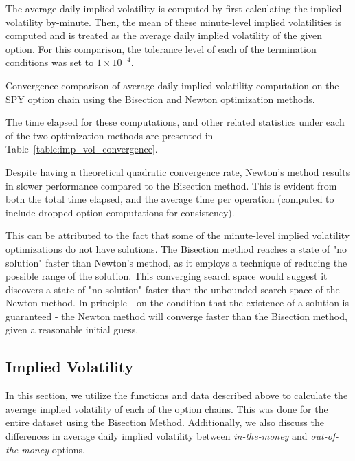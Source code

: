 \documentclass[10pt]{article}
\begin{document}
        The average daily implied volatility is computed by first calculating the implied volatility by-minute. Then, the mean of these minute-level implied volatilities is computed and is treated as the average daily implied volatility of the given option. For this comparison, the tolerance level of each of the termination conditions was set to $1 \times 10^{-4}$.
        
        \begin{table}[h]
            \centering
            \caption{Convergence comparison of average daily implied volatility computation on the SPY option chain using the Bisection and Newton optimization methods.}
            \label{table:imp_vol_convergence}
        \end{table}

        The time elapsed for these computations, and other related statistics under each of the two optimization methods are presented in Table~\ref{table:imp_vol_convergence}.

        Despite having a theoretical quadratic convergence rate, Newton's method results in slower performance compared to the Bisection method. This is evident from both the total time elapsed, and the average time per operation (computed to include dropped option computations for consistency). 
        
        This can be attributed to the fact that some of the minute-level implied volatility optimizations do not have solutions. The Bisection method reaches a state of "no solution" faster than Newton's method, as it employs a technique of reducing the possible range of the solution. This converging search space would suggest it discovers a state of "no solution" faster than the unbounded search space of the Newton method. In principle - on the condition that the existence of a solution is guaranteed - the Newton method will converge faster than the Bisection method, given a reasonable initial guess.



    \newpage
    \subsection{Implied Volatility}

    In this section, we utilize the functions and data described above to calculate the average implied volatility of each of the option chains. This was done for the entire dataset using the Bisection Method. Additionally, we also discuss the differences in average daily implied volatility between \textit{in-the-money} and \textit{out-of-the-money} options.
\end{document}
